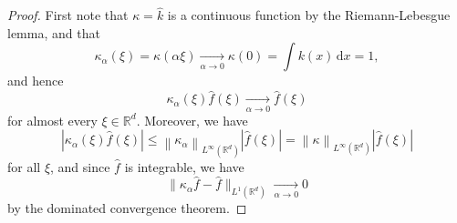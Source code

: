 \documentclass[10pt,a4paper]{amsart}
\newcommand{\R}{\mathbb{R}}
\newcommand{\abs}[1]{\left\lvert#1\right\rvert}
\newcommand{\di}{\,\mathrm{d}}
\newcommand{\fhat}[1]{\widehat{#1}}
\newcommand{\norm}[1]{\left\lVert#1\right\rVert}
\newcommand{\smallnorm}[1]{\lVert#1\rVert}
\begin{document}
\begin{proof}
    First note that \(\kappa = \fhat{k}\) is a continuous function by the Riemann-Lebesgue lemma, and that
    \begin{equation*}
        \kappa_\alpha(\xi)
        = \kappa (\alpha\xi)
        \xrightarrow[\alpha\to 0]{}
        \kappa(0)
        = \int k(x)\di x = 1,
    \end{equation*}
    and hence
    \begin{equation*}
        \kappa_\alpha(\xi)\fhat{f}(\xi)
        \xrightarrow[\alpha\to 0]{} \fhat{f}(\xi)
    \end{equation*}
    for almost every \(\xi\in\R^d\).
    Moreover, we have
    \begin{equation*}
        \abs{\kappa_\alpha(\xi)\fhat{f}(\xi)}
        \leq
        \norm{\kappa_\alpha}_{L^\infty(\R^d)}
        \abs{\fhat{f}(\xi)}
        =
        \norm{\kappa}_{L^\infty(\R^d)}
        \abs{\fhat{f}(\xi)}
    \end{equation*}
    for all \(\xi\),
    and since \(\fhat{f}\) is integrable,
    we have
    \begin{equation*}
        \smallnorm{\kappa_\alpha \fhat{f} - \fhat{f}}_{L^1(\R^d)}
        \xrightarrow[\alpha\to 0]{}0
    \end{equation*}
    by the dominated convergence theorem.
    

\end{proof}
\end{document}
